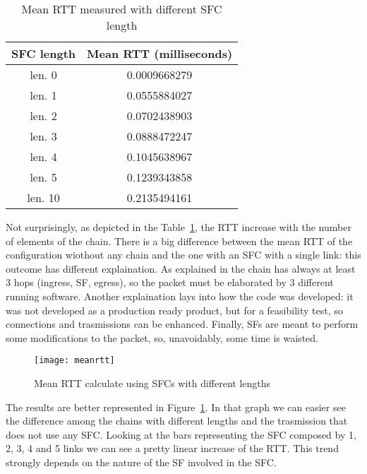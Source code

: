 \begin{table}[H]
\centering
\begin{tabular}{@{}cc@{}}
\toprule
\textbf{SFC length} & \textbf{Mean RTT (milliseconds)} \\ \midrule
len. 0              & 0.0009668279      \\
len. 1              & 0.0555884027      \\
len. 2              & 0.0702438903      \\
len. 3              & 0.0888472247      \\
len. 4              & 0.1045638967      \\
len. 5              & 0.1239343858      \\
len. 10             & 0.2135494161      \\ \bottomrule
\end{tabular}
\caption{Mean RTT measured with different SFC length}
\label{chap:tests:sec:rtt:tab:meanrtt}
\end{table}

Not surprisingly, as depicted in the Table~\ref{chap:tests:sec:rtt:tab:meanrtt},
the RTT increase with the number of elements of the chain. There is a big difference between the mean RTT of the configuration wiothout any chain and the one with an SFC with a single link: this outcome has different explaination. As explained in  the chain has always at least 3 hops (ingress, SF, egress), so the packet must be elaborated by 3 different running software. Another explaination lays into how the code was developed: it was not developed as a production ready product, but for a feasibility test, so connections and trasmissions can be enhanced. Finally, SFs are meant to perform some modifications to the packet, so, unavoidably, some time is waisted. 

\begin{figure}[H]
  \centering
  \texttt{[image: meanrtt]}
  \caption{Mean RTT calculate using SFCs with different lengths}
  \label{chap:tests:sec:rtt:img:meanstt}
\end{figure}

The results are better represented in Figure~\ref{chap:tests:sec:rtt:img:meanstt}. In that graph we can easier see the difference among the chains with different lengths and the trasmission that does not use any SFC. Looking at the bars representing the SFC composed by 1, 2, 3, 4 and 5 links we can see a pretty linear increase of the RTT. This trend strongly depends on the nature of the SF involved in the SFC.
